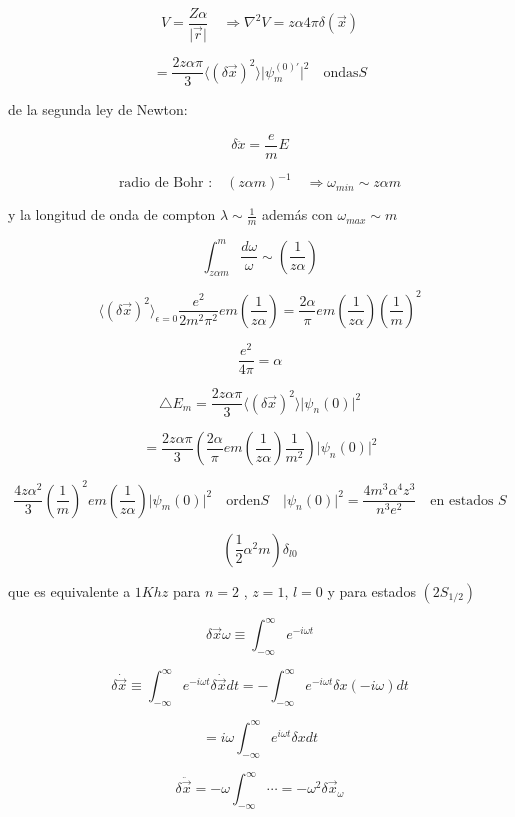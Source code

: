 \documentclass{report}
\begin{document}
\[V = \frac{Z \alpha}{\vert \overrightarrow{r} \vert } \quad \Rightarrow \nabla^2 V = z \alpha 4 \pi \delta (\overrightarrow{x})\]

\[= \frac{2z \alpha \pi}{3} \langle (\delta \overrightarrow{x})^2 \rangle \vert \psi _{m}^{(0) \prime} \vert ^2 \quad \text{ondas} S \]

de la segunda ley de Newton:

\[\delta \ddot{x} = \frac{e}{m} E\]

\[\text{radio de Bohr :} \quad (z \alpha m)^{-1} \quad \Rightarrow \omega_{min} \sim z \alpha m\]

y la longitud de onda de compton $\lambda \sim \frac{1}{m} $ además con $\omega _{max} \sim m$

\[\int_{z \alpha m} ^{m} \frac{d \omega}{\omega} \sim (\frac{1}{z \alpha })\]

\[\langle (\delta \overrightarrow{x})^2 \rangle _{\epsilon = 0} \frac{e^2}{2m^2 \pi^2} em (\frac{1}{z \alpha }) = \frac{2 \alpha}{\pi} em (\frac{1}{z  \alpha})(\frac{1}{m})^2 \]

\[\frac{e^2 }{4 \pi } = \alpha \]

\[\bigtriangleup E_m = \frac{2 z \alpha \pi }{3 } \langle (\delta \overrightarrow{x})^2 \rangle \vert \psi _{n}(0) \vert ^2 \]

\[= \frac{2 z \alpha \pi }{3} (\frac{2 \alpha}{\pi} em (\frac{1}{z \alpha})\frac{1}{m^2 }) \vert \psi_{n}(0) \vert ^2 \]

\[\frac{4z \alpha ^2}{3} (\frac{1}{m})^2 em (\frac{1}{z \alpha}) \vert \psi _m (0) \vert ^2 \quad \text{orden} S \quad \vert \psi _n (0) \vert ^2 = \frac{4m^3 \alpha ^4 z^3}{n^3 e^2 } \quad \text{en estados } S \]

\begin{equation}
[\frac{8}{3 \pi} \frac{z^4 \alpha ^3}{n^3 } (em \frac{1}{z \alpha})] (\frac{1}{2} \alpha ^2 m)\delta_{l0}
\end{equation}

que es equivalente a $1Khz$ para $n=2$ , $z=1$, $l = 0$ y para estados $(2 S_{1/2})$

\[\delta \vec{x} \omega \equiv \int _{- \infty}^{\infty } e^{-i\omega t }\]

\[\delta \dot{\vec{x}} \equiv \int_{-\infty }^{\infty } e^{-i \omega t} \delta \dot{\vec{x}} dt = - \int _{-\infty }^{\infty } e^{-i \omega t } \delta x (- i \omega ) dt \]

\[= i \omega \int _{-\infty}^{\infty} e^{i \omega t} \delta x d t \]

\[\delta \ddot{\vec{x}} = - \omega \int_{-\infty}^{\infty} \cdots = - \omega ^{2} \delta \overrightarrow{x}_{\omega}\]
\end{document}
